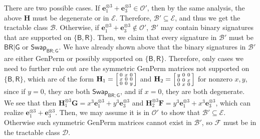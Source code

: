 \documentclass[11pt]{article}
\newcommand{\db}{\mathsf{B}}
\newcommand{\dg}{\mathsf{G}}
\newcommand{\dr}{\mathsf{R}}
\newcommand{\genperm}{\textsf{GenPerm}\xspace}
\newcommand{\swhelper}[1]{$\mathsf{Swap}_{#1}$\xspace}
\newcommand{\swbr}{\swhelper{\db \dr; \dg}}
\newcommand{\teh}{^{\otimes 3}}
\newcommand{\tractE}{$\mathscr{B}$\xspace}
\newcommand{\tractBGR}{$\mathscr{D}$\xspace}
\begin{document}
There are two possible cases.
If $\mathbf{e}_1\teh + \mathbf{e}_3\teh \in \mathcal{O}'$, then by the same analysis, the above $\mathbf{H}$ must be degenerate or in $\mathcal{E}$.
Therefore, $\mathcal{B}' \subseteq \mathcal{E}$, and thus we get the tractable class \tractE.
Otherwise, if $\mathbf{e}_1\teh + \mathbf{e}_3\teh \notin \mathcal{O}'$, $\mathcal{B}'$ may contain binary signatures that are supported on $\{\db, \dr\}$.
Then, we claim that every signature in $\mathcal{B}'$ must be $\db \dr | \dg$ or \swbr.
We have already shown above that the binary signatures in $\mathcal{B}'$ are either \genperm or possibly supported on $\{\db, \dr\}$.
Therefore, only cases we need to further rule out are the symmetric \genperm matrices not supported on $\{\db, \dr\}$, which are of the form $\mathbf{H}_1 = \begin{bsmallmatrix}
  0 & x & 0 \\
  x & 0 & 0 \\
  0 & 0 & y
  \end{bsmallmatrix}$ and $\mathbf{H}_2 = \begin{bsmallmatrix}
  y & 0 & 0 \\
  0 & 0 & x \\
  0 & x & 0
\end{bsmallmatrix}$ for nonzero $x, y$, since if $y = 0$, they are both \swbr, and if $x = 0$, they are both degenerate.
We see that then $\mathbf{H}_1\teh \mathbf{G} = x^3 \mathbf{e}_1\teh + y^3 \mathbf{e}_3\teh$ and $\mathbf{H}_2\teh \mathbf{F} = y^3 \mathbf{e}_1\teh + x^3 \mathbf{e}_3\teh$, which can realize $\mathbf{e}_1\teh + \mathbf{e}_3\teh$. 
Then, we may assume it is in $\mathcal{O}'$ to show that $\mathcal{B}' \subseteq \mathcal{E}$.
Otherwise such symmetric \genperm matrices cannot exist in $\mathcal{B}'$, so $\mathcal{F}$ must be in the tractable class \tractBGR.
\end{document}
